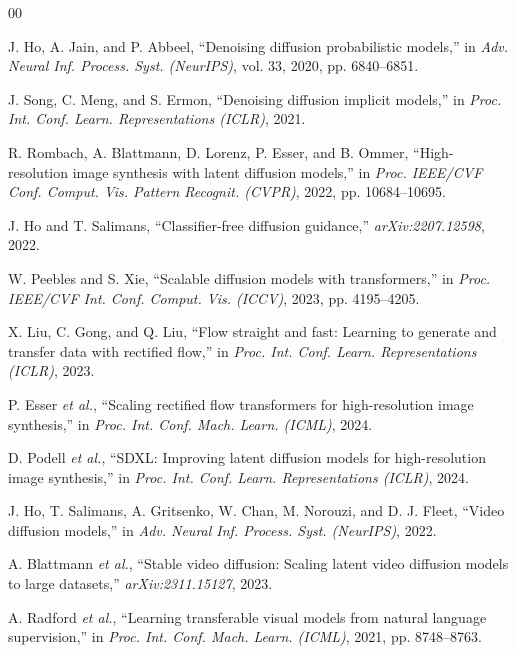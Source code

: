 \documentclass[conference]{IEEEtran}
\begin{document}
\scriptsize
\setlength{\itemsep}{0pt}
\setlength{\parskip}{0pt}
\begin{thebibliography}{00}

 J. Ho, A. Jain, and P. Abbeel, ``Denoising diffusion probabilistic models,'' in \emph{Adv. Neural Inf. Process. Syst. (NeurIPS)}, vol. 33, 2020, pp. 6840--6851.

 J. Song, C. Meng, and S. Ermon, ``Denoising diffusion implicit models,'' in \emph{Proc. Int. Conf. Learn. Representations (ICLR)}, 2021.

 R. Rombach, A. Blattmann, D. Lorenz, P. Esser, and B. Ommer, ``High-resolution image synthesis with latent diffusion models,'' in \emph{Proc. IEEE/CVF Conf. Comput. Vis. Pattern Recognit. (CVPR)}, 2022, pp. 10684--10695.

 J. Ho and T. Salimans, ``Classifier-free diffusion guidance,'' \emph{arXiv:2207.12598}, 2022.

 W. Peebles and S. Xie, ``Scalable diffusion models with transformers,'' in \emph{Proc. IEEE/CVF Int. Conf. Comput. Vis. (ICCV)}, 2023, pp. 4195--4205.

 X. Liu, C. Gong, and Q. Liu, ``Flow straight and fast: Learning to generate and transfer data with rectified flow,'' in \emph{Proc. Int. Conf. Learn. Representations (ICLR)}, 2023.

 P. Esser \emph{et al.}, ``Scaling rectified flow transformers for high-resolution image synthesis,'' in \emph{Proc. Int. Conf. Mach. Learn. (ICML)}, 2024.

 D. Podell \emph{et al.}, ``SDXL: Improving latent diffusion models for high-resolution image synthesis,'' in \emph{Proc. Int. Conf. Learn. Representations (ICLR)}, 2024.

 J. Ho, T. Salimans, A. Gritsenko, W. Chan, M. Norouzi, and D. J. Fleet, ``Video diffusion models,'' in \emph{Adv. Neural Inf. Process. Syst. (NeurIPS)}, 2022.

 A. Blattmann \emph{et al.}, ``Stable video diffusion: Scaling latent video diffusion models to large datasets,'' \emph{arXiv:2311.15127}, 2023.

 A. Radford \emph{et al.}, ``Learning transferable visual models from natural language supervision,'' in \emph{Proc. Int. Conf. Mach. Learn. (ICML)}, 2021, pp. 8748--8763.


\end{thebibliography}
\end{document}

